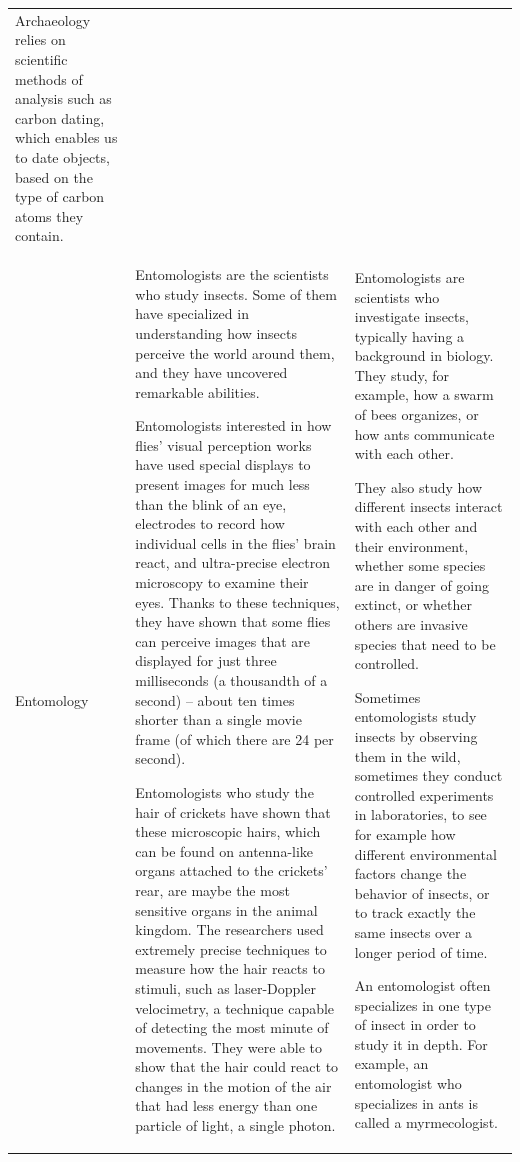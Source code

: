 \documentclass[
  doc,floatsintext]{apa6}
\begin{document}
\begin{longtable}[t]{>{\raggedright\arraybackslash}p{5em}>{\raggedright\arraybackslash}p{20em}>{\raggedright\arraybackslash}p{20em}}
Archaeology relies on scientific methods of analysis such as carbon dating, which enables us to date objects, based on the type of carbon atoms they contain.\\
Entomology & Entomologists are the scientists who study insects. Some of them have specialized in understanding how insects perceive the world around them, and they have uncovered remarkable abilities. 

Entomologists interested in how flies’ visual perception works have used special displays to present images for much less than the blink of an eye, electrodes to record how individual cells in the flies’ brain react, and ultra-precise electron microscopy to examine their eyes. Thanks to these techniques, they have shown that some flies can perceive images that are displayed for just three milliseconds (a thousandth of a second) – about ten times shorter than a single movie frame (of which there are 24 per second). 

Entomologists who study the hair of crickets have shown that these microscopic hairs, which can be found on antenna-like organs attached to the crickets’ rear, are maybe the most sensitive organs in the animal kingdom. The researchers used extremely precise techniques to measure how the hair reacts to stimuli, such as laser-Doppler velocimetry, a technique capable of detecting the most minute of movements. They were able to show that the hair could react to changes in the motion of the air that had less energy than one particle of light, a single photon. & Entomologists are scientists who investigate insects, typically having a background in biology. They study, for example, how a swarm of bees organizes, or how ants communicate with each other. 

They also study how different insects interact with each other and their environment, whether some species are in danger of going extinct, or whether others are invasive species that need to be controlled.

Sometimes entomologists study insects by observing them in the wild, sometimes they conduct controlled experiments in laboratories, to see for example how different environmental factors change the behavior of insects, or to track exactly the same insects over a longer period of time.

An entomologist often specializes in one type of insect in order to study it in depth. For example, an entomologist who specializes in ants is called a myrmecologist.\\
\bottomrule
\end{longtable}
\end{document}
